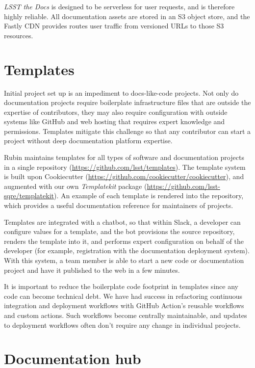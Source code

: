 \documentclass[11pt,twoside]{article}
\begin{document}
\textit{LSST the Docs} is designed to be serverless for user requests, and is therefore highly reliable.
All documentation assets are stored in an S3 object store, and the Fastly CDN provides routes user traffic from versioned URLs to those S3 resources.

\section{Templates}

Initial project set up is an impediment to docs-like-code projects.
Not only do documentation projects require boilerplate infrastructure files that are outside the expertise of contributors, they may also require configuration with outside systems like GitHub and web hosting that requires expert knowledge and permissions.
Templates mitigate this challenge so that any contributor can start a project without deep documentation platform expertise.

Rubin maintains templates for all types of software and documentation projects in a single repository (\url{https://github.com/lsst/templates}).
The template system is built upon Cookiecutter (\url{https://github.com/cookiecutter/cookiecutter}), and augmented with our own \textit{Templatekit} package (\url{https://github.com/lsst-sqre/templatekit}).
An example of each template is rendered into the repository, which provides a useful documentation reference for maintainers of projects.

Templates are integrated with a chatbot, so that within Slack, a developer can configure values for a template, and the bot provisions the source repository, renders the template into it, and performs expert configuration on behalf of the developer (for example, registration with the documentation deployment system).
With this system, a team member is able to start a new code or documentation project and have it published to the web in a few minutes.

It is important to reduce the boilerplate code footprint in templates since any code can become technical debt.
We have had success in refactoring continuous integration and deployment workflows with GitHub Action's reusable workflows and custom actions.
Such workflows become centrally maintainable, and updates to deployment workflows often don't require any change in individual projects.

\label{sec:hub}
\section{Documentation hub}
\end{document}
